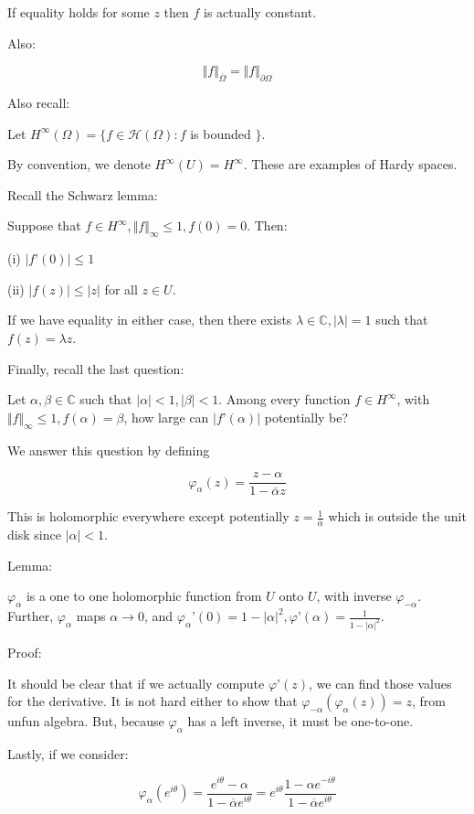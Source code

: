 \documentclass[10pt]{article}
\newcommand{\calH}{\mathcal{H}}
\begin{document}
If equality holds for some $z$ then $f$ is actually constant.

Also:

$$ \Vert f \Vert_{\overline{\Omega}} = \Vert f \Vert_{\partial \Omega} $$

Also recall:

Let $H^\infty(\Omega) = \{ f \in \calH(\Omega) : f$ is bounded $\}$.

By convention, we denote $H^\infty(U) = H^\infty$. These are examples of Hardy spaces.

Recall the Schwarz lemma:

Suppose that $f \in H^\infty, \Vert f \Vert_\infty \leq 1, f(0) = 0$. Then:

(i) $| f’(0)| \leq 1$

(ii) $ |f(z)| \leq |z| $ for all $z \in U$.

If we have equality in either case, then there exists $\lambda \in \mathbb{C}, |\lambda| = 1$ such that $f(z) = \lambda z$.

Finally, recall the last question:

Let $\alpha, \beta \in \mathbb{C}$ such that $|\alpha| <1, |\beta| < 1$. Among every function $f \in H^\infty$, with $\Vert f \Vert_\infty \leq 1, f(\alpha) = \beta$, how large can $|f’(\alpha)|$ potentially be?

We answer this question by defining 

$$\varphi_\alpha(z) = \frac{z - \alpha}{1 - \overline{\alpha} z} $$

This is holomorphic everywhere except potentially $z = \frac{1}{\overline{\alpha}}$ which is outside the unit disk since $|\alpha| < 1$.

Lemma:

$ \varphi_\alpha$ is a one to one holomorphic function from $U$ onto $U$, with inverse $\varphi_{-\alpha}$. Further, $\varphi_\alpha$ maps $\alpha \to 0$, and $\varphi_\alpha’(0) = 1 - |\alpha|^2, \varphi’(\alpha) = \frac{1}{1 - |\alpha|^2}$. 

Proof:

It should be clear that if we actually compute $\varphi’(z)$, we can find those values for the derivative. It is not hard either to show that $\varphi_{-\alpha}(\varphi_\alpha(z)) = z$, from unfun algebra. But, because $\varphi_\alpha$ has a left inverse, it must be one-to-one.

Lastly, if we consider:

$$\varphi_\alpha(e^{i\theta}) = \frac{e^{i\theta} - \alpha}{1 - \overline{\alpha}e^{i\theta}} = e^{i\theta} \frac{1 - \alpha e^{-i\theta}}{1 - \overline{\alpha} e^{i\theta}}$$
\end{document}
